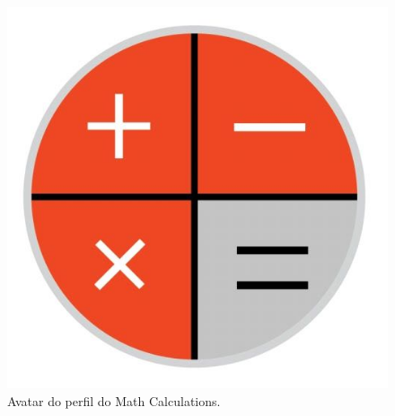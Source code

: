 \begin{figure}[h!tbp]
    \centering
    \includegraphics[width=0.1\linewidth]{img/bot4_logo.png}
    \caption{Avatar do perfil do Math Calculations.}
    \label{fig:bot4_logo}
\end{figure}
